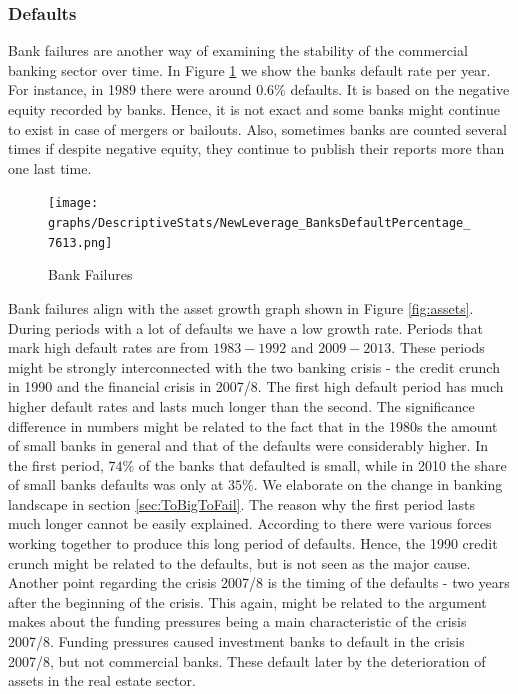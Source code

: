 \documentclass[12pt, a4paper]{article} %
\begin{document}

\subsubsection{Defaults}

Bank failures are another way of examining the stability of the commercial banking sector over time. In Figure \ref{fig:banks_default} we show the banks default rate per year. For instance, in 1989 there were around $0.6\%$ defaults. It is based on the negative equity recorded by banks. Hence, it is not exact and some banks might continue to exist in case of mergers or bailouts. Also, sometimes banks are counted several times if despite negative equity, they continue to publish their reports more than one last time.

\begin{figure}[H]
\texttt{[image: graphs/DescriptiveStats/NewLeverage\_BanksDefaultPercentage\_7613.png]}
\centering
\caption{Bank Failures}
\label{fig:banks_default}
\end{figure}


Bank failures align with the asset growth graph shown in Figure \ref{fig:assets}. During periods with a lot of defaults we have a low growth rate. Periods that mark high default rates are from $1983-1992$ and $2009-2013$. These periods might be strongly interconnected with the two banking crisis - the credit crunch in 1990 and the financial crisis in 2007/8. The first high default period has much higher default rates and lasts much longer than the second.
The significance difference in numbers might be related to the fact that in the 1980s the amount of small banks in general and that of the defaults were considerably higher.  In the first period, $74\%$ of the banks that defaulted is small, while in 2010 the share of small banks defaults was only at $35\%$. We elaborate on the change in banking landscape in section \ref{sec:ToBigToFail}. The reason why the first period lasts much longer cannot be easily explained. According to \citet{federal1997history} there were various forces working together to produce this long period of defaults. Hence, the 1990 credit crunch might be related to the defaults, but is not seen as the major cause.
Another point regarding the crisis 2007/8 is the timing of the defaults - two years after the beginning of the crisis. This again, might be related to the argument \citet{antoniades2019commercial} makes about the funding pressures being a main characteristic of the crisis 2007/8. Funding pressures caused investment banks to default in the crisis 2007/8, but not commercial banks. These default later by the deterioration of assets in the real estate sector.
\end{document}
